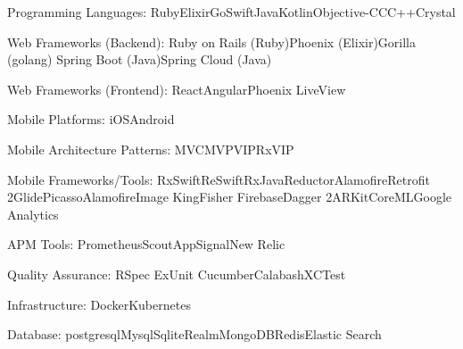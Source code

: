 \documentclass[10pt,a4paper]{article} %
\begin{document}


\inlineheadsection %
{Programming Languages:}
{Ruby\bull Elixir\bull Go\bull Swift\bull Java\bull Kotlin\bull Objective-C\bull C\bull C++\bull Crystal}

\inlineheadsection %
{Web Frameworks (Backend):}
{Ruby on Rails (Ruby)\bull Phoenix (Elixir)\bull Gorilla (golang) \bull Spring Boot (Java)\bull Spring Cloud (Java) }

\inlineheadsection %
{Web Frameworks (Frontend):}
{React\bull Angular\bull Phoenix LiveView}

\inlineheadsection %
{Mobile Platforms:}
{iOS\bull Android}

\inlineheadsection %
{Mobile Architecture Patterns:}
{MVC\bull MVP\bull VIP\bull RxVIP}

\inlineheadsection %
{Mobile Frameworks/Tools:}
{RxSwift\bull ReSwift\bull RxJava\bull Reductor\bull Alamofire\bull Retrofit 2\bull Glide\bull Picasso\bull AlamofireImage \bull KingFisher
\bull Firebase\bull Dagger 2\bull ARKit\bull CoreML\bull Google Analytics}

\inlineheadsection %
{APM Tools:}
{Prometheus\bull Scout\bull AppSignal\bull New Relic}

\inlineheadsection %
{Quality Assurance:}
{RSpec \bull ExUnit \bull Cucumber\bull Calabash\bull XCTest}

\inlineheadsection %
{Infrastructure:}
{Docker\bull Kubernetes}

\inlineheadsection %
{Database:}
{postgresql\bull Mysql\bull Sqlite\bull Realm\bull MongoDB\bull Redis\bull Elastic Search}
\end{document}
